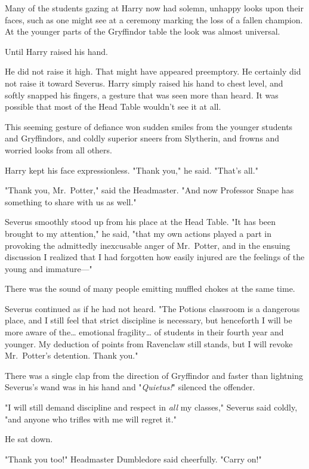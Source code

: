 Many of the students gazing at Harry now had solemn, unhappy looks upon their 
faces, such as one might see at a ceremony marking the loss of a fallen 
champion. At the younger parts of the Gryffindor table the look was almost 
universal.

Until Harry raised his hand.

He did not raise it high. That might have appeared preemptory. He certainly did 
not raise it toward Severus. Harry simply raised his hand to chest level, and 
softly snapped his fingers, a gesture that was seen more than heard. It was 
possible that most of the Head Table wouldn't see it at all.

This seeming gesture of defiance won sudden smiles from the younger students 
and Gryffindors, and coldly superior sneers from Slytherin, and frowns and 
worried looks from all others.

Harry kept his face expressionless. "Thank you," he said. "That's all."

"Thank you, Mr.~Potter," said the Headmaster. "And now Professor Snape has 
something to share with us as well."

Severus smoothly stood up from his place at the Head Table. "It has been 
brought to my attention," he said, "that my own actions played a part in 
provoking the admittedly inexcusable anger of Mr.~Potter, and in the ensuing 
discussion I realized that I had forgotten how easily injured are the feelings 
of the young and immature---"

There was the sound of many people emitting muffled chokes at the same time.

Severus continued as if he had not heard. "The Potions classroom is a dangerous 
place, and I still feel that strict discipline is necessary, but henceforth I 
will be more aware of the{\ldots} emotional fragility{\ldots} of students in 
their fourth year and younger. My deduction of points from Ravenclaw still 
stands, but I will revoke Mr.~Potter's detention. Thank you."

There was a single clap from the direction of Gryffindor and faster than 
lightning Severus's wand was in his hand and "\emph{Quietus!}" silenced the 
offender.

"I will still demand discipline and respect in \emph{all} my classes," Severus 
said coldly, "and anyone who trifles with me will regret it."

He sat down.

"Thank you too!" Headmaster Dumbledore said cheerfully. "Carry on!"

